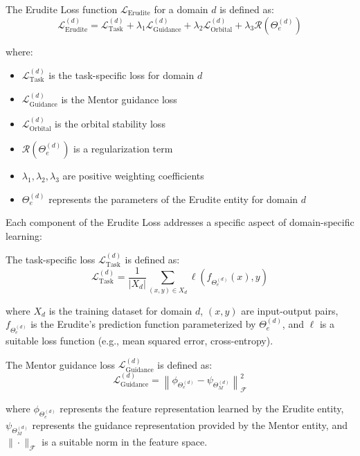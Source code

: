 \begin{definition}
The Erudite Loss function $\mathcal{L}_{\text{Erudite}}$ for a domain $d$ is defined as:
\begin{equation}
\mathcal{L}_{\text{Erudite}}^{(d)} = \mathcal{L}_{\text{Task}}^{(d)} + \lambda_1 \mathcal{L}_{\text{Guidance}}^{(d)} + \lambda_2 \mathcal{L}_{\text{Orbital}}^{(d)} + \lambda_3 \mathcal{R}(\Theta_e^{(d)})
\end{equation}

where:
\begin{itemize}
    \item $\mathcal{L}_{\text{Task}}^{(d)}$ is the task-specific loss for domain $d$
    \item $\mathcal{L}_{\text{Guidance}}^{(d)}$ is the Mentor guidance loss
    \item $\mathcal{L}_{\text{Orbital}}^{(d)}$ is the orbital stability loss
    \item $\mathcal{R}(\Theta_e^{(d)})$ is a regularization term
    \item $\lambda_1, \lambda_2, \lambda_3$ are positive weighting coefficients
    \item $\Theta_e^{(d)}$ represents the parameters of the Erudite entity for domain $d$
\end{itemize}
\end{definition}

Each component of the Erudite Loss addresses a specific aspect of domain-specific learning:

\begin{definition}
The task-specific loss $\mathcal{L}_{\text{Task}}^{(d)}$ is defined as:
\begin{equation}
\mathcal{L}_{\text{Task}}^{(d)} = \frac{1}{|X_d|}\sum_{(x,y) \in X_d} \ell\left(f_{\Theta_e^{(d)}}(x), y\right)
\end{equation}

where $X_d$ is the training dataset for domain $d$, $(x,y)$ are input-output pairs, $f_{\Theta_e^{(d)}}$ is the Erudite's prediction function parameterized by $\Theta_e^{(d)}$, and $\ell$ is a suitable loss function (e.g., mean squared error, cross-entropy).
\end{definition}

\begin{definition}
The Mentor guidance loss $\mathcal{L}_{\text{Guidance}}^{(d)}$ is defined as:
\begin{equation}
\mathcal{L}_{\text{Guidance}}^{(d)} = \left\|\phi_{\Theta_e^{(d)}} - \psi_{\Theta_M^{(d)}}\right\|^2_{\mathcal{F}}
\end{equation}

where $\phi_{\Theta_e^{(d)}}$ represents the feature representation learned by the Erudite entity, $\psi_{\Theta_M^{(d)}}$ represents the guidance representation provided by the Mentor entity, and $\|\cdot\|_{\mathcal{F}}$ is a suitable norm in the feature space.
\end{definition}

